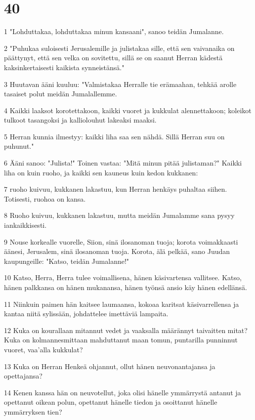 \chapter{40}

\par 1 "Lohduttakaa, lohduttakaa minun kansaani", sanoo teidän Jumalanne.
\par 2 "Puhukaa suloisesti Jerusalemille ja julistakaa sille, että sen vaivanaika on päättynyt, että sen velka on sovitettu, sillä se on saanut Herran kädestä kaksinkertaisesti kaikista synneistänsä."
\par 3 Huutavan ääni kuuluu: "Valmistakaa Herralle tie erämaahan, tehkää arolle tasaiset polut meidän Jumalallemme.
\par 4 Kaikki laaksot korotettakoon, kaikki vuoret ja kukkulat alennettakoon; koleikot tulkoot tasangoksi ja kalliolouhut lakeaksi maaksi.
\par 5 Herran kunnia ilmestyy: kaikki liha saa sen nähdä. Sillä Herran suu on puhunut."
\par 6 Ääni sanoo: "Julista!" Toinen vastaa: "Mitä minun pitää julistaman?" Kaikki liha on kuin ruoho, ja kaikki sen kauneus kuin kedon kukkanen:
\par 7 ruoho kuivuu, kukkanen lakastuu, kun Herran henkäys puhaltaa siihen. Totisesti, ruohoa on kansa.
\par 8 Ruoho kuivuu, kukkanen lakastuu, mutta meidän Jumalamme sana pysyy iankaikkisesti.
\par 9 Nouse korkealle vuorelle, Siion, sinä ilosanoman tuoja; korota voimakkaasti äänesi, Jerusalem, sinä ilosanoman tuoja. Korota, älä pelkää, sano Juudan kaupungeille: "Katso, teidän Jumalanne!"
\par 10 Katso, Herra, Herra tulee voimallisena, hänen käsivartensa vallitsee. Katso, hänen palkkansa on hänen mukanansa, hänen työnsä ansio käy hänen edellänsä.
\par 11 Niinkuin paimen hän kaitsee laumaansa, kokoaa karitsat käsivarrellensa ja kantaa niitä sylissään, johdattelee imettäviä lampaita.
\par 12 Kuka on kourallaan mitannut vedet ja vaaksalla määrännyt taivaitten mitat? Kuka on kolmannesmittaan mahduttanut maan tomun, puntarilla punninnut vuoret, vaa'alla kukkulat?
\par 13 Kuka on Herran Henkeä ohjannut, ollut hänen neuvonantajansa ja opettajansa?
\par 14 Kenen kanssa hän on neuvotellut, joka olisi hänelle ymmärrystä antanut ja opettanut oikean polun, opettanut hänelle tiedon ja osoittanut hänelle ymmärryksen tien?
